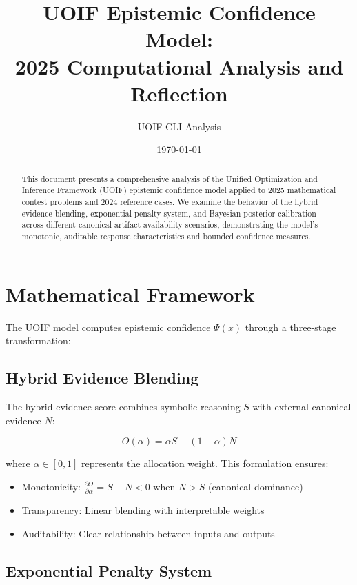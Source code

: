 \documentclass[12pt,a4paper]{article}
\title{UOIF Epistemic Confidence Model: \\
2025 Computational Analysis and Reflection}
\author{UOIF CLI Analysis}
\date{\today}
\begin{document}
\maketitle

\begin{abstract}
This document presents a comprehensive analysis of the Unified Optimization and Inference Framework (UOIF) epistemic confidence model applied to 2025 mathematical contest problems and 2024 reference cases. We examine the behavior of the hybrid evidence blending, exponential penalty system, and Bayesian posterior calibration across different canonical artifact availability scenarios, demonstrating the model's monotonic, auditable response characteristics and bounded confidence measures.
\end{abstract}

\section{Mathematical Framework}

The UOIF model computes epistemic confidence $\Psi(x)$ through a three-stage transformation:

\subsection{Hybrid Evidence Blending}

The hybrid evidence score combines symbolic reasoning $S$ with external canonical evidence $N$:

\begin{equation}
O(\alpha) = \alpha S + (1-\alpha) N
\end{equation}

where $\alpha \in [0,1]$ represents the allocation weight. This formulation ensures:
\begin{itemize}
    \item Monotonicity: $\frac{\partial O}{\partial \alpha} = S - N < 0$ when $N > S$ (canonical dominance)
    \item Transparency: Linear blending with interpretable weights
    \item Auditability: Clear relationship between inputs and outputs
\end{itemize}

\subsection{Exponential Penalty System}
\end{document}
